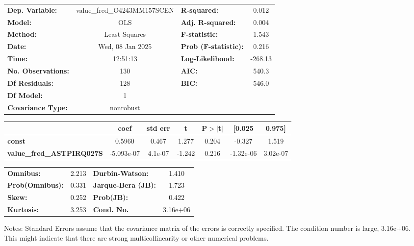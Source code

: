 \begin{center}
\begin{tabular}{lclc}
\toprule
\textbf{Dep. Variable:}           & value\_fred\_O4243MM157SCEN & \textbf{  R-squared:         } &     0.012   \\
\textbf{Model:}                   &             OLS             & \textbf{  Adj. R-squared:    } &     0.004   \\
\textbf{Method:}                  &        Least Squares        & \textbf{  F-statistic:       } &     1.543   \\
\textbf{Date:}                    &       Wed, 08 Jan 2025      & \textbf{  Prob (F-statistic):} &    0.216    \\
\textbf{Time:}                    &           12:51:13          & \textbf{  Log-Likelihood:    } &   -268.13   \\
\textbf{No. Observations:}        &               130           & \textbf{  AIC:               } &     540.3   \\
\textbf{Df Residuals:}            &               128           & \textbf{  BIC:               } &     546.0   \\
\textbf{Df Model:}                &                 1           & \textbf{                     } &             \\
\textbf{Covariance Type:}         &          nonrobust          & \textbf{                     } &             \\
\bottomrule
\end{tabular}
\begin{tabular}{lcccccc}
                                  & \textbf{coef} & \textbf{std err} & \textbf{t} & \textbf{P$> |$t$|$} & \textbf{[0.025} & \textbf{0.975]}  \\
\midrule
\textbf{const}                    &       0.5960  &        0.467     &     1.277  &         0.204        &       -0.327    &        1.519     \\
\textbf{value\_fred\_ASTPIRQ027S} &   -5.093e-07  &      4.1e-07     &    -1.242  &         0.216        &    -1.32e-06    &     3.02e-07     \\
\bottomrule
\end{tabular}
\begin{tabular}{lclc}
\textbf{Omnibus:}       &  2.213 & \textbf{  Durbin-Watson:     } &    1.410  \\
\textbf{Prob(Omnibus):} &  0.331 & \textbf{  Jarque-Bera (JB):  } &    1.723  \\
\textbf{Skew:}          &  0.252 & \textbf{  Prob(JB):          } &    0.422  \\
\textbf{Kurtosis:}      &  3.253 & \textbf{  Cond. No.          } & 3.16e+06  \\
\bottomrule
\end{tabular}
\end{center}

Notes: \newline
 [1] Standard Errors assume that the covariance matrix of the errors is correctly specified. \newline
 [2] The condition number is large, 3.16e+06. This might indicate that there are \newline
 strong multicollinearity or other numerical problems.